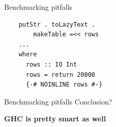 \documentclass[20pt]{beamer}
\newcommand{\vspaced}{
    \vspace{5mm}
}
\begin{document}
\begin{frame}[fragile]{Benchmarking pitfalls}
    \begin{lstlisting}
    putStr . toLazyText .
        makeTable =<< rows
    ...
    where
      rows :: IO Int
      rows = return 20000
      {-# NOINLINE rows #-}
    \end{lstlisting}
\end{frame}

\begin{frame}{Benchmarking pitfalls}
    Conclusion? \\
    \vspaced
    \textbf{GHC is pretty smart as well}
\end{frame}

\end{document}
